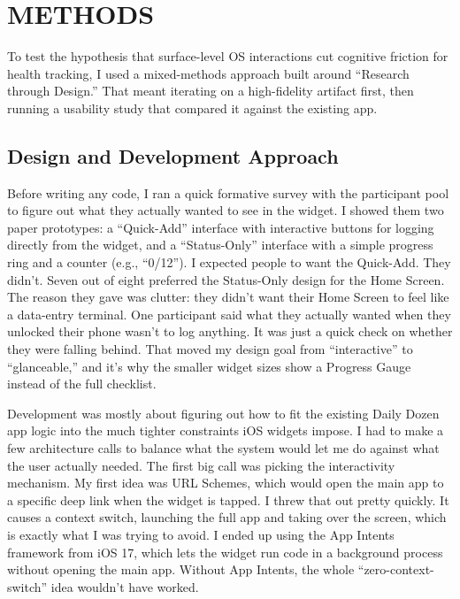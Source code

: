 \documentclass[10pt,twocolumn]{article}
\begin{document}
\section{METHODS}

To test the hypothesis that surface-level OS interactions cut cognitive friction for health tracking, I used a mixed-methods approach built around ``Research through Design.'' That meant iterating on a high-fidelity artifact first, then running a usability study that compared it against the existing app.

\subsection{Design and Development Approach}

Before writing any code, I ran a quick formative survey with the participant pool to figure out what they actually wanted to see in the widget. I showed them two paper prototypes: a ``Quick-Add'' interface with interactive buttons for logging directly from the widget, and a ``Status-Only'' interface with a simple progress ring and a counter (e.g., ``0/12''). I expected people to want the Quick-Add. They didn't. Seven out of eight preferred the Status-Only design for the Home Screen. The reason they gave was clutter: they didn't want their Home Screen to feel like a data-entry terminal. One participant said what they actually wanted when they unlocked their phone wasn't to log anything. It was just a quick check on whether they were falling behind. That moved my design goal from ``interactive'' to ``glanceable,'' and it's why the smaller widget sizes show a Progress Gauge instead of the full checklist.

Development was mostly about figuring out how to fit the existing Daily Dozen app logic into the much tighter constraints iOS widgets impose.\cite{AppleHIGWidgets} I had to make a few architecture calls to balance what the system would let me do against what the user actually needed. The first big call was picking the interactivity mechanism. My first idea was URL Schemes, which would open the main app to a specific deep link when the widget is tapped. I threw that out pretty quickly. It causes a context switch, launching the full app and taking over the screen, which is exactly what I was trying to avoid. I ended up using the App Intents framework from iOS 17,\cite{AppleHIGWidgets} which lets the widget run code in a background process without opening the main app. Without App Intents, the whole ``zero-context-switch'' idea wouldn't have worked.
\end{document}

